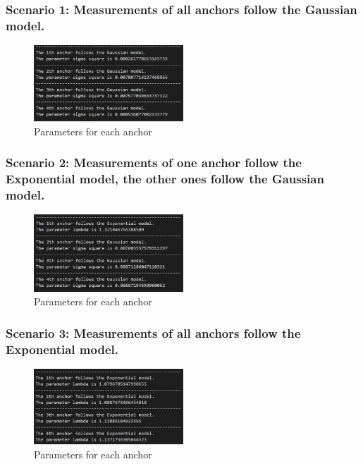\documentclass[a4paper]{article}
\begin{document}
\subsubsection{Scenario 1: Measurements of all anchors follow the Gaussian model.}
\begin{figure}[h]
	\begin{center}
		\includegraphics[width=0.5\textwidth]{scenario1param.jpg}
		\caption{Parameters for each anchor}
	\end{center}
\end{figure}
\subsubsection{Scenario 2: Measurements of one anchor follow the Exponential model, the other ones follow the Gaussian model.}
\begin{figure}[h]
	\begin{center}
		\includegraphics[width=0.5\textwidth]{scenario2param.jpg}
		\caption{Parameters for each anchor}
	\end{center}
\end{figure}

\subsubsection{Scenario 3: Measurements of all anchors follow the Exponential model.}
\begin{figure}[h]
	\begin{center}
		\includegraphics[width=0.5\textwidth]{scenario3param.jpg}
		\caption{Parameters for each anchor}
	\end{center}
\end{figure}
\end{document}
